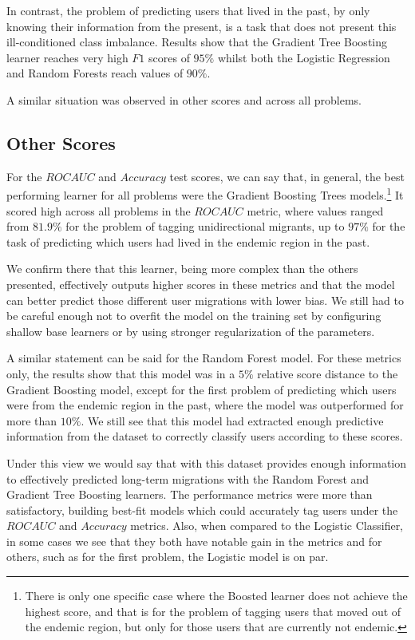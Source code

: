 In contrast, the problem of predicting users that lived in the past, by only knowing their information from the present, is a task that does not present this ill-conditioned class imbalance.
Results show that the Gradient Tree Boosting learner reaches very high $F1$ scores of $95\%$ whilst both the Logistic Regression and Random Forests reach values of $90\%$.

A similar situation was observed in other scores and across all problems.


\subsection{Other Scores}\label{subsec:master_table_other_scores}

For the $ROC AUC$ and $Accuracy$ test scores, we can say that, in general, the best performing learner for all problems were the Gradient Boosting Trees models.\footnote{There is only one specific case where the Boosted learner does not achieve the highest score, and that is for the problem of tagging users that moved out of the endemic region, but only for those users that are currently not endemic.}
It scored high across all problems in the $ROC AUC$ metric, where values ranged from $81.9\%$ for the problem of tagging unidirectional migrants, up to $97\%$ for the task of predicting which users had lived in the endemic region in the past.

We confirm there that this learner, being more complex than the others presented, effectively outputs higher scores in these metrics and
that the model can better predict those different user migrations with lower bias.
We still had to be careful enough not to overfit the model on the training set by configuring shallow base learners or by using stronger regularization of the parameters.

A similar statement can be said for the Random Forest model.
For these metrics only, the results show that this model was in a $5\%$ relative score distance to the Gradient Boosting model, except for the first problem of predicting which users were from the endemic region in the past, where the model was outperformed for more than $10\%$.
We still see that this model had extracted enough predictive information from the dataset to correctly classify users according to these scores.

Under this view we would say that with this dataset provides enough information to effectively predicted long-term migrations with the Random Forest and Gradient Tree Boosting learners.
The performance metrics were more than satisfactory, building best-fit models which could accurately tag users under the $ROC AUC$ and $Accuracy$ metrics.
Also, when compared to the Logistic Classifier, in some cases we see that they both have notable gain in the metrics and for others, such as for the first problem, the Logistic model is on par.

